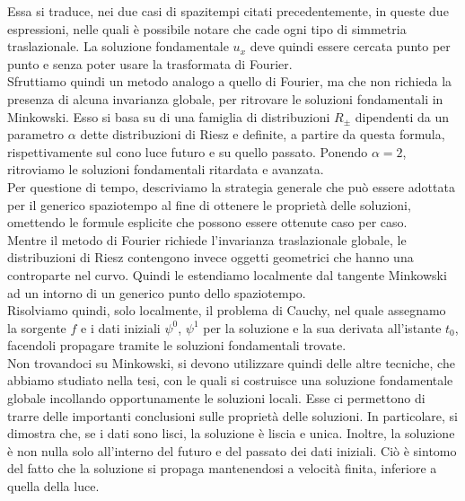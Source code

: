 \documentclass[11pt,a4paper]{article}
\theoremstyle{classicthm}
\theoremstyle{classicthm}
\theoremstyle{definition}
\begin{document}
Essa si traduce, nei due casi di spazitempi citati precedentemente, in queste due espressioni, nelle quali è possibile notare che cade ogni tipo di simmetria traslazionale. La soluzione fondamentale $u_x$ deve quindi essere cercata punto per punto e senza poter usare la trasformata di Fourier.\\

Sfruttiamo quindi un metodo analogo a quello di Fourier, ma che non richieda la presenza di alcuna invarianza globale, per ritrovare le soluzioni fondamentali in Minkowski. Esso si basa su di una famiglia di distribuzioni $R_\pm$ dipendenti da un parametro $\alpha$ dette distribuzioni di Riesz e definite, a partire da questa formula, rispettivamente sul cono luce futuro e su quello passato. Ponendo $\alpha=2$, ritroviamo le soluzioni fondamentali ritardata e avanzata.\\

Per questione di tempo, descriviamo la strategia generale che può essere adottata per il generico spaziotempo al fine di ottenere le proprietà delle soluzioni, omettendo le formule esplicite che possono essere ottenute caso per caso.\\
Mentre il metodo di Fourier richiede l'invarianza traslazionale globale, le distribuzioni di Riesz contengono invece oggetti geometrici che hanno una controparte nel curvo. Quindi le estendiamo localmente dal tangente Minkowski ad un intorno di un generico punto dello spaziotempo.\\

Risolviamo quindi, solo localmente, il problema di Cauchy, nel quale assegnamo la sorgente $f$ e i dati iniziali $\psi^0$, $\psi^1$ per la soluzione e la sua derivata all'istante $t_0$, facendoli propagare tramite le soluzioni fondamentali trovate.\\

Non trovandoci su Minkowski, si devono utilizzare quindi delle altre tecniche, che abbiamo studiato nella tesi, con le quali si costruisce una soluzione fondamentale globale incollando opportunamente le soluzioni locali. Esse ci permettono di trarre delle importanti conclusioni sulle proprietà delle soluzioni. In particolare, si dimostra che, se i dati sono lisci, la soluzione è liscia e unica. Inoltre, la soluzione è non nulla solo all'interno del futuro e del passato dei dati iniziali. Ciò è sintomo del fatto che la soluzione si propaga mantenendosi a velocità finita, inferiore a quella della luce.\\
\end{document}
